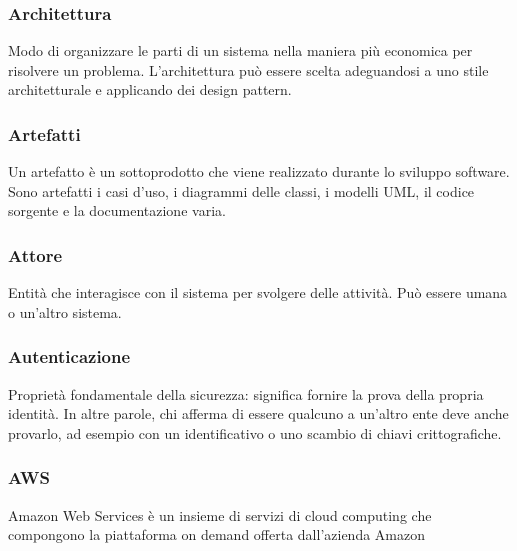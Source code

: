 \subsubsection*{Architettura}
Modo di organizzare le parti di un sistema nella maniera più economica per risolvere un problema. L'architettura può essere scelta adeguandosi a uno stile architetturale e applicando dei design pattern.

\subsubsection*{Artefatti}
Un artefatto è un sottoprodotto che viene realizzato durante lo sviluppo software. Sono artefatti i casi d'uso, i diagrammi delle classi, i modelli UML\glo, il codice sorgente e la documentazione varia.

\subsubsection*{Attore}
Entità che interagisce con il sistema per svolgere delle attività. Può essere umana o un'altro sistema.

\subsubsection*{Autenticazione}
Proprietà fondamentale della sicurezza: significa fornire la prova della propria identità. In altre parole, chi afferma di essere qualcuno a un'altro ente deve anche provarlo, ad esempio con un identificativo o uno scambio di chiavi crittografiche.

\subsubsection*{AWS}
Amazon Web Services è un insieme di servizi di cloud computing che compongono la piattaforma on demand offerta dall'azienda Amazon

